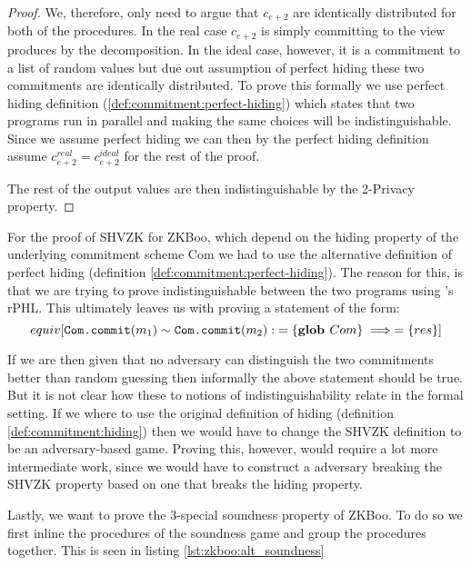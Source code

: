 \begin{proof}
  We, therefore, only need to argue that $c_{e+2}$ are identically distributed
  for both of the procedures. In the real case $c_{e+2}$ is simply committing to
  the view produces by the decomposition. In the ideal case, however, it is a
  commitment to a list of random values but due out assumption of perfect hiding
  these two commitments are identically distributed.
  To prove this formally we use perfect hiding definition
  (\ref{def:commitment:perfect-hiding}) which states that two programs run in
  parallel and making the same choices will be indistinguishable. Since we
  assume perfect hiding we can then by the perfect hiding definition assume
  $c^{real}_{e+2} = c^{ideal}_{e+2}$ for the rest of the proof.

  The rest of the output values are then indistinguishable by the 2-Privacy property.
\end{proof}

For the proof of SHVZK for ZKBoo, which depend on the hiding property of the
underlying commitment scheme Com we had to use the alternative definition of
perfect hiding (definition \ref{def:commitment:perfect-hiding}). The reason for
this, is that we are trying to prove indistinguishable between the two programs
using \easycrypt's rPHL. This ultimately leaves us with proving a statement of
the form:
\[
  equiv[\texttt{Com.commit}(m_{1}) \sim \texttt{Com.commit}(m_{2}) :\; =\{\textbf{glob } Com\} \implies =\{res\}]
\]

If we are then given that no adversary can distinguish the two commitments
better than random guessing then informally the above statement should be true.
But it is not clear how these to notions of indistinguishability relate in the
formal setting.
If we where to use the original definition of hiding (definition
\ref{def:commitment:hiding}) then we would have to change the SHVZK definition
to be an adversary-based game. Proving this, however, would require a lot more
intermediate work, since we would have to construct a adversary breaking the
SHVZK property based on one that breaks the hiding property.

Lastly, we want to prove the 3-special soundness property of ZKBoo. To do so we
first inline the procedures of the soundness game and group the procedures
together. This is seen in listing \ref{lst:zkboo:alt_soundness}

